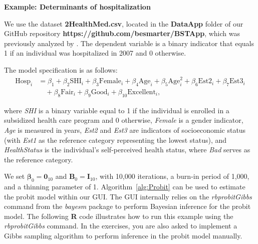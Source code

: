 \textbf{Example: Determinants of hospitalization}

We use the dataset \textbf{2HealthMed.csv}, located in the \textbf{DataApp} folder of our GitHub repository \textbf{\textbf{https://github.com/besmarter/BSTApp}}, which was previously analyzed by \cite{Ramirez2013}. The dependent variable is a binary indicator that equals 1 if an individual was hospitalized in 2007 and 0 otherwise.

The model specification is as follows:
\begin{align*}
	\text{Hosp}_i &= {\beta}_1 + {\beta}_2 \text{SHI}_i + {\beta}_3 \text{Female}_i + {\beta}_4 \text{Age}_i + {\beta}_5 \text{Age}_i^2 + {\beta}_6 \text{Est2}_i + {\beta}_7 \text{Est3}_i \\
	&\quad + {\beta}_8 \text{Fair}_i + {\beta}_9 \text{Good}_i + {\beta}_{10} \text{Excellent}_i,
\end{align*}

where \textit{SHI} is a binary variable equal to 1 if the individual is enrolled in a subsidized health care program and 0 otherwise, \textit{Female} is a gender indicator, \textit{Age} is measured in years, \textit{Est2} and \textit{Est3} are indicators of socioeconomic status (with \textit{Est1} as the reference category representing the lowest status), and \textit{HealthStatus} is the individual’s self-perceived health status, where \textit{Bad} serves as the reference category.

We set $\bm{\beta}_0 = {\bm{0}}_{10}$ and ${\bm{B}}_0 = {\bm{I}}_{10}$, with 10,000 iterations, a burn-in period of 1,000, and a thinning parameter of 1. Algorithm~\ref{alg:Probit} can be used to estimate the probit model within our GUI. The GUI internally relies on the \textit{rbprobitGibbs} command from the \textit{bayesm} package to perform Bayesian inference for the probit model. The following \textbf{R} code illustrates how to run this example using the \textit{rbprobitGibbs} command. In the exercises, you are also asked to implement a Gibbs sampling algorithm to perform inference in the probit model manually.

